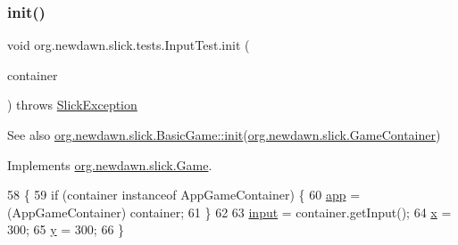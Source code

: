 \subsubsection{\texorpdfstring{init()}{init()}}
{\footnotesize\ttfamily void org.\+newdawn.\+slick.\+tests.\+Input\+Test.\+init (\begin{DoxyParamCaption}\item[{\mbox{\hyperlink{classorg_1_1newdawn_1_1slick_1_1_game_container}{Game\+Container}}}]{container }\end{DoxyParamCaption}) throws \mbox{\hyperlink{classorg_1_1newdawn_1_1slick_1_1_slick_exception}{Slick\+Exception}}\hspace{0.3cm}{\ttfamily [inline]}}

\begin{DoxySeeAlso}{See also}
\mbox{\hyperlink{classorg_1_1newdawn_1_1slick_1_1_basic_game_a8af0900217e4d389249f71367b22d114}{org.\+newdawn.\+slick.\+Basic\+Game\+::init}}(\mbox{\hyperlink{classorg_1_1newdawn_1_1slick_1_1_game_container}{org.\+newdawn.\+slick.\+Game\+Container}}) 
\end{DoxySeeAlso}


Implements \mbox{\hyperlink{interfaceorg_1_1newdawn_1_1slick_1_1_game_ad2dd6affab08bb8fdb5fab0815957b7a}{org.\+newdawn.\+slick.\+Game}}.


\begin{DoxyCode}
58                                                                     \{
59         \textcolor{keywordflow}{if} (container instanceof AppGameContainer) \{
60             \mbox{\hyperlink{classorg_1_1newdawn_1_1slick_1_1tests_1_1_input_test_a9f5c6e57ecc104f4baea82dcfc34106c}{app}} = (AppGameContainer) container;
61         \}
62         
63         \mbox{\hyperlink{classorg_1_1newdawn_1_1slick_1_1tests_1_1_input_test_a0f7ab1cf90c55a44d41928128e6a37a8}{input}} = container.getInput();
64         \mbox{\hyperlink{classorg_1_1newdawn_1_1slick_1_1tests_1_1_input_test_a95f99c94f1e661a629501a3205d78c15}{x}} = 300;
65         \mbox{\hyperlink{classorg_1_1newdawn_1_1slick_1_1tests_1_1_input_test_a18ce34ad5ddc268a0420c747d5b19d05}{y}} = 300;
66     \}
\end{DoxyCode}
\mbox{\label{classorg_1_1newdawn_1_1slick_1_1tests_1_1_input_test_ac6d6fa874dbf27ac0517fff69a7c4eeb}} 
